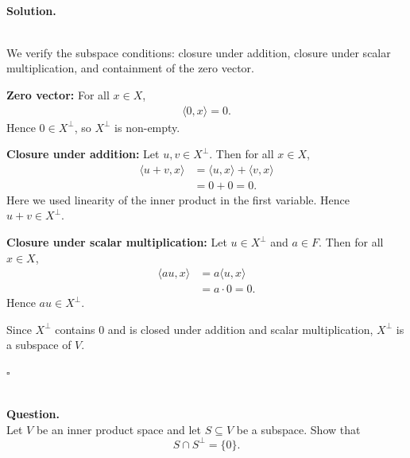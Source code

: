 \documentclass{article}
\begin{document}
\noindent\\
\textbf{Solution.}\\
\quad\\
\begin{mdframed}[linewidth=1pt]
We verify the subspace conditions: closure under addition, closure under scalar multiplication, and containment of the zero vector.

\textbf{Zero vector:} For all $x \in X$,
\begin{align*}
\langle 0, x \rangle = 0.
\end{align*}
Hence $0 \in X^\perp$, so $X^\perp$ is non-empty.

\textbf{Closure under addition:} Let $u, v \in X^\perp$. Then for all $x \in X$,
\begin{align*}
\langle u + v, x \rangle &= \langle u, x \rangle + \langle v, x \rangle \\
&= 0 + 0 = 0.
\end{align*}
Here we used linearity of the inner product in the first variable. Hence $u + v \in X^\perp$.

\textbf{Closure under scalar multiplication:} Let $u \in X^\perp$ and $a \in F$. Then for all $x \in X$,
\begin{align*}
\langle a u, x \rangle &= a \langle u, x \rangle \\
&= a \cdot 0 = 0.
\end{align*}
Hence $a u \in X^\perp$.

Since $X^\perp$ contains $0$ and is closed under addition and scalar multiplication, $X^\perp$ is a subspace of $V$.

\hfill $\square$
\end{mdframed}

\bigskip

\hfill \break  $~\!\!$ \dotfill \medskip \\
\textbf{Question.}\\
Let $V$ be an inner product space and let $S \subseteq V$ be a subspace. Show that
\[
S \cap S^\perp = \{0\}.
\]
\end{document}
